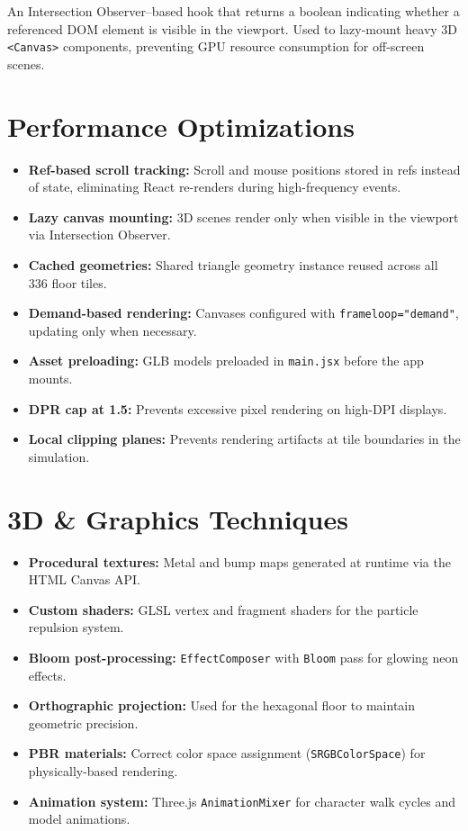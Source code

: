 \documentclass[12pt,a4paper]{article}
\begin{document}
An Intersection Observer--based hook that returns a boolean indicating whether a referenced DOM element is visible in the viewport. Used to lazy-mount heavy 3D \texttt{<Canvas>} components, preventing GPU resource consumption for off-screen scenes.

\section{Performance Optimizations}

\begin{itemize}
    \item \textbf{Ref-based scroll tracking:} Scroll and mouse positions stored in refs instead of state, eliminating React re-renders during high-frequency events.
    \item \textbf{Lazy canvas mounting:} 3D scenes render only when visible in the viewport via Intersection Observer.
    \item \textbf{Cached geometries:} Shared triangle geometry instance reused across all 336 floor tiles.
    \item \textbf{Demand-based rendering:} Canvases configured with \texttt{frameloop="demand"}, updating only when necessary.
    \item \textbf{Asset preloading:} GLB models preloaded in \texttt{main.jsx} before the app mounts.
    \item \textbf{DPR cap at 1.5:} Prevents excessive pixel rendering on high-DPI displays.
    \item \textbf{Local clipping planes:} Prevents rendering artifacts at tile boundaries in the simulation.
\end{itemize}

\section{3D \& Graphics Techniques}

\begin{itemize}
    \item \textbf{Procedural textures:} Metal and bump maps generated at runtime via the HTML Canvas API.
    \item \textbf{Custom shaders:} GLSL vertex and fragment shaders for the particle repulsion system.
    \item \textbf{Bloom post-processing:} \texttt{EffectComposer} with \texttt{Bloom} pass for glowing neon effects.
    \item \textbf{Orthographic projection:} Used for the hexagonal floor to maintain geometric precision.
    \item \textbf{PBR materials:} Correct color space assignment (\texttt{SRGBColorSpace}) for physically-based rendering.
    \item \textbf{Animation system:} Three.js \texttt{AnimationMixer} for character walk cycles and model animations.
\end{itemize}
\end{document}

